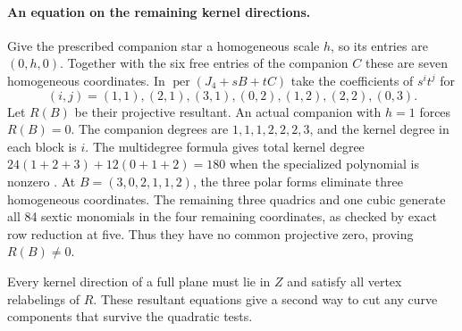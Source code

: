 \paragraph{An equation on the remaining kernel directions.}
Give the prescribed companion star a homogeneous scale \(h\), so
its entries are \((0,h,0)\). Together with the six free entries of
the companion \(C\) these are seven homogeneous coordinates. In
\(\operatorname{per}(J_4+sB+tC)\) take the coefficients of
\(s^it^j\) for
\[
 (i,j)=(1,1),(2,1),(3,1),(0,2),(1,2),(2,2),(0,3).
\]
Let \(R(B)\) be their projective resultant. An actual companion with
\(h=1\) forces \(R(B)=0\). The companion degrees are
\(1,1,1,2,2,2,3\), and the kernel degree in each block is \(i\).
The multidegree formula gives total kernel degree
\(24(1+2+3)+12(0+1+2)=180\) when the specialized polynomial is
nonzero \cite[Introduction and Lemma~3.4]{dandreaDickensteinResultant}.
At \(B=(3,0,2,1,1,2)\), the three polar forms eliminate three
homogeneous coordinates. The remaining three quadrics and one cubic
generate all 84 sextic monomials in the four remaining coordinates,
as checked by exact row reduction at five. Thus they have no common
projective zero, proving \(R(B)\ne0\).

Every kernel direction of a full plane must lie in \(Z\) and satisfy
all vertex relabelings of \(R\). These resultant equations give a
second way to cut any curve components that survive the quadratic tests.


